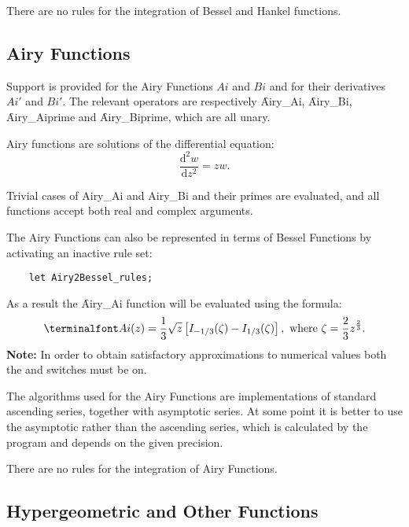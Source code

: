 There are no rules for the integration of Bessel and Hankel functions.
 
\subsection{Airy Functions}
\hypertarget{operator:AIRY_AI}{}
\hypertarget{operator:AIRY_AIPRIME}{}
\hypertarget{operator:AIRY_BI}{}
\hypertarget{operator:AIRY_BIPRIME}{}
\hypertarget{AIRYF}{}

Support is provided for the Airy Functions $Ai$ and $Bi$ and for their
derivatives $Ai'$ and $Bi'$.  The relevant operators are
respectively \f{Airy\_Ai}, \f{Airy\_Bi}, \f{Airy\_Aiprime} and
\f{Airy\_Biprime}, which are all unary.

Airy functions are solutions of the differential equation:
$$ \frac{\mathrm{d}^2 w}{\mathrm{d}z^2} = z w.$$

Trivial cases of Airy\_Ai and Airy\_Bi and their primes are evaluated,
and all functions accept both real and complex arguments.

The Airy Functions can also be represented in terms of Bessel
Functions by activating an inactive rule set:
\begin{verbatim}
    let Airy2Bessel_rules;
\end{verbatim}
As a result the \f{Airy\_Ai} function will be evaluated using the formula: 
\[
\f{Ai}(z) =  \frac{1}{3} \sqrt{z} \left[I_{-1/3}(\zeta)
- I_{1/3}(\zeta)\right], \text{ where }
 \zeta =  \frac{2}{3} z^{\frac{2}{3}}.
\]
\textbf{Note:} In order to obtain satisfactory approximations
to numerical values both the  and  switches
must be on.

The algorithms used for the Airy Functions are implementations of
standard ascending series, together with asymptotic series.  At some
point it is better to use the asymptotic rather than the ascending
series, which is calculated by the program and depends on the given
precision.

There are no rules for the integration of Airy Functions.

\subsection{Hypergeometric and Other Functions}
\hypertarget{operator:KUMMERM}{}
\hypertarget{operator:KUMMERU}{}
\hypertarget{operator:LOMMEL1}{}
\hypertarget{operator:LOMMEL2}{}
\hypertarget{operator:STRUVEH}{}
\hypertarget{operator:STRUVEL}{}
\hypertarget{operator:WHITTAKERM}{}
\hypertarget{operator:WHITTAKERU}{}
\hypertarget{HYPERGEOM}{}

